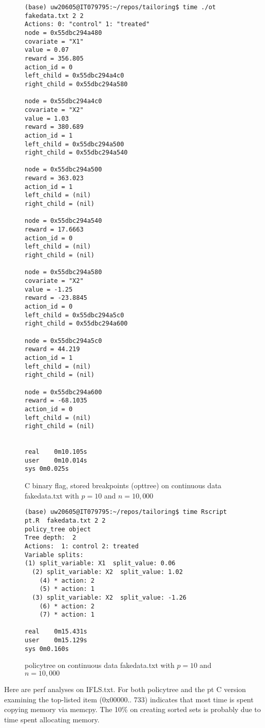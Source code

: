 \documentclass{article}
\begin{document}
\begin{figure}
  \centering
\begin{verbatim}
(base) uw20605@IT079795:~/repos/tailoring$ time ./ot fakedata.txt 2 2 
Actions: 0: "control" 1: "treated" 
node = 0x55dbc294a480
covariate = "X1"
value = 0.07
reward = 356.805
action_id = 0
left_child = 0x55dbc294a4c0
right_child = 0x55dbc294a580

node = 0x55dbc294a4c0
covariate = "X2"
value = 1.03
reward = 380.689
action_id = 1
left_child = 0x55dbc294a500
right_child = 0x55dbc294a540

node = 0x55dbc294a500
reward = 363.023
action_id = 1
left_child = (nil)
right_child = (nil)

node = 0x55dbc294a540
reward = 17.6663
action_id = 0
left_child = (nil)
right_child = (nil)

node = 0x55dbc294a580
covariate = "X2"
value = -1.25
reward = -23.8845
action_id = 0
left_child = 0x55dbc294a5c0
right_child = 0x55dbc294a600

node = 0x55dbc294a5c0
reward = 44.219
action_id = 1
left_child = (nil)
right_child = (nil)

node = 0x55dbc294a600
reward = -68.1035
action_id = 0
left_child = (nil)
right_child = (nil)


real	0m10.105s
user	0m10.014s
sys	0m0.025s
\end{verbatim}
  \caption{C binary flag, stored breakpoints (opttree) on continuous
    data fakedata.txt
    with $p=10$ and $n=10,000$}
\end{figure}

\begin{figure}
  \centering
\begin{verbatim}
(base) uw20605@IT079795:~/repos/tailoring$ time Rscript pt.R  fakedata.txt 2 2 
policy_tree object 
Tree depth:  2 
Actions:  1: control 2: treated 
Variable splits: 
(1) split_variable: X1  split_value: 0.06 
  (2) split_variable: X2  split_value: 1.02 
    (4) * action: 2 
    (5) * action: 1 
  (3) split_variable: X2  split_value: -1.26 
    (6) * action: 2 
    (7) * action: 1 

real	0m15.431s
user	0m15.129s
sys	0m0.160s
\end{verbatim}
  \caption{policytree on continuous data fakedata.txt
    with $p=10$ and $n=10,000$}
\end{figure}

Here are perf analyses on IFLS.txt. For both policytree and the pt C
version examining the top-listed item (0x00000.. 733) indicates that
most time is spent copying memory via memcpy. The 10\% on creating
sorted sets is probably due to time spent allocating memory.
\end{document}
